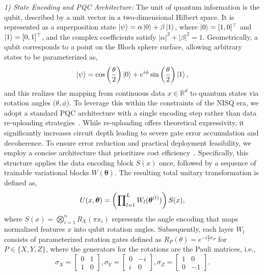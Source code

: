 \documentclass[pdflatex,sn-mathphys-num]{sn-jnl}%
\theoremstyle{thmstyleone}%
\theoremstyle{thmstyletwo}%
\theoremstyle{thmstylethree}%
\begin{document}
\noindent\textit{1) State Encoding and PQC Architecture:}
The unit of quantum information is the qubit, described by a unit vector in a two-dimensional Hilbert space. It is represented as a superposition state $\ket{\psi}=\alpha\ket{0}+\beta\ket{1}$, where $\ket{0}=[1, 0]^\top$ and $\ket{1}=[0, 1]^\top$, and the complex coefficients satisfy $|\alpha|^2+|\beta|^2=1$. Geometrically, a qubit corresponds to a point on the Bloch sphere surface, allowing arbitrary states to be parameterized as,
\begin{equation}
    \ket{\psi}=\cos\left(\frac{\theta}{2}\right)\ket{0}+e^{i\phi}\sin\left(\frac{\theta}{2}\right)\ket{1},
% 
\end{equation}
and this realizes the mapping from continuous data $x \in \mathbb{R}^d$ to quantum states via rotation angles ($\theta, \phi$).
To leverage this within the constraints of the NISQ era, we adopt a standard PQC architecture with a single encoding step rather than data re-uploading strategies~\citep{per_20_dat}. While re-uploading offers theoretical expressivity, it significantly increases circuit depth leading to severe gate error accumulation and decoherence. To ensure error reduction and practical deployment feasibility, we employ a concise architecture that prioritizes cost efficiency~\citep{kan_17_har}. Specifically, this structure applies the data encoding block $S(x)$ once, followed by a sequence of trainable variational blocks $W(\boldsymbol{\theta})$. The resulting total unitary transformation is defined as,
\begin{equation}
    U(x,\boldsymbol{\theta}) = \left( \prod_{l=1}^{L}\nolimits W_l(\boldsymbol{\theta}^{(l)}) \right) S(x),  
%     
\end{equation}
where $S(x) = \bigotimes_{i=1}^{n} R_X(\pi x_i)$ represents the angle encoding that maps normalized features $x$ into qubit rotation angles. Subsequently, each layer $W_l$ consists of parameterized rotation gates defined as $R_P(\theta)=e^{-i\frac{\theta}{2}\sigma_P}$ for $P \in \{X, Y, Z\}$, where the generators for the rotations are the Pauli matrices, i.e., 
\begin{equation}
\label{eq: Pauli-generators}
    \sigma_X=\begin{bmatrix} 0 & 1 \\ 1 & 0 \end{bmatrix}, %
    \sigma_Y=\begin{bmatrix} 0 & -i \\ i & 0 \end{bmatrix}, %
    \sigma_Z=\begin{bmatrix} 1 & 0 \\ 0 & -1 \end{bmatrix}.
\end{equation}
\end{document}
